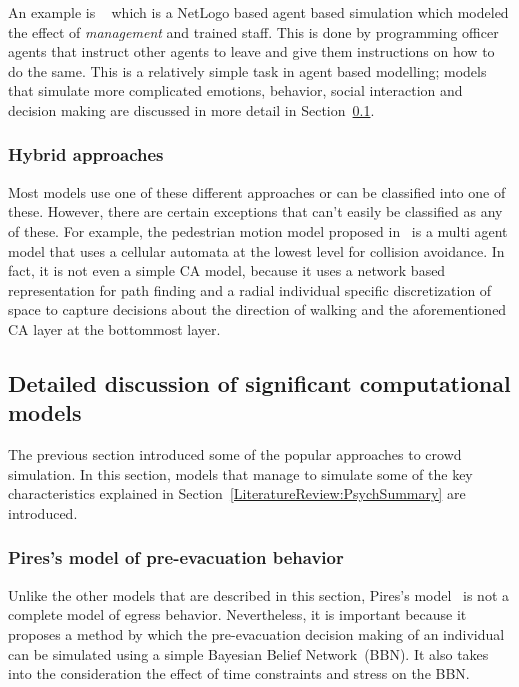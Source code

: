  An example is ~\cite{AugustijnBeckers:2010cr} which is a NetLogo based agent based simulation which modeled the effect of \emph{management} and trained staff. This is done by programming officer agents that instruct other agents to leave and give them instructions on how to do the same. This is a relatively simple task in agent based modelling; models that simulate more complicated emotions, behavior, social interaction and decision making are discussed in more detail in Section~\ref{LiteratureReview:DetailedModels}.

\subsubsection{Hybrid approaches}
Most models use one of these different approaches or can be classified into one of these. However, there are certain exceptions that can't easily be classified as any of these. For example, the pedestrian motion model proposed in~\cite{Bierlaire:2003uj} is a multi agent model that uses a cellular automata at the lowest level for collision avoidance. In fact, it is not even a simple CA model, because it uses a network based representation for path finding and a radial individual specific discretization of space to capture decisions about the direction of walking and the aforementioned CA layer at the bottommost layer.

\subsection{Detailed discussion of significant computational models}
\label{LiteratureReview:DetailedModels}

The previous section introduced some of the popular approaches to crowd simulation. In this section, models that manage to simulate some of the key characteristics explained in Section~\ref{LiteratureReview:PsychSummary} are introduced.

\subsubsection{Pires's model of pre-evacuation behavior}

Unlike the other models that are described in this section, Pires's model~\cite{Pires:2005gs} is not a complete model of egress behavior. Nevertheless, it is important because it proposes a method by which the pre-evacuation decision making of an individual can be simulated using a simple Bayesian Belief Network~(BBN). It also takes into the consideration the effect of time constraints and stress on the BBN.

